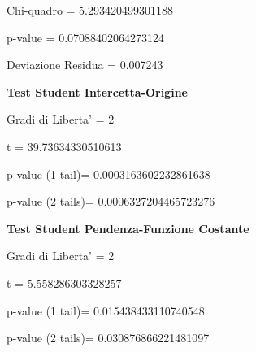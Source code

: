 \documentclass{article}
\begin{document}
Chi-quadro = 5.293420499301188

p-value = 0.07088402064273124

Deviazione Residua = 0.007243

\textbf{Test Student Intercetta-Origine}

Gradi di Liberta' = 2

t = 39.73634330510613

p-value (1 tail)= 0.0003163602232861638

p-value (2 tails)= 0.0006327204465723276

\textbf{Test Student Pendenza-Funzione Costante}

Gradi di Liberta' = 2

t = 5.558286303328257

p-value (1 tail)= 0.015438433110740548

p-value (2 tails)= 0.030876866221481097
\end{document}
